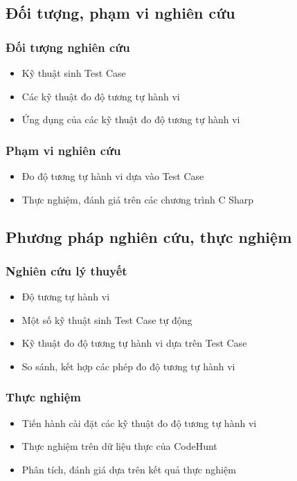 	\subsection*{Đối tượng, phạm vi nghiên cứu}	
		\subsubsection*{Đối tượng nghiên cứu}
		\begin{itemize}
		\item  Kỹ thuật sinh Test Case
		\item  Các kỹ thuật đo độ tương tự hành vi
		\item  Ứng dụng của các kỹ thuật đo độ tương tự hành vi
		\end{itemize}
	
		\subsubsection*{Phạm vi nghiên cứu}
		\begin{itemize}
		\item  Đo độ tương tự hành vi dựa vào Test Case
		\item  Thực nghiệm, đánh giá trên các chương trình C Sharp
		\end{itemize}


	\subsection*{Phương pháp nghiên cứu, thực nghiệm}
		\subsubsection*{Nghiên cứu lý thuyết}
			\begin{itemize}
			\item Độ tương tự hành vi
			\item Một số kỹ thuật sinh Test Case tự động
			\item Kỹ thuật đo độ tương tự hành vi dựa trên Test Case
			\item So sánh, kết hợp các phép đo độ tương tự hành vi
			\end{itemize}
		
		\subsubsection*{Thực nghiệm}
			\begin{itemize}
			\item Tiến hành cài đặt các kỹ thuật đo độ tương tự hành vi
			\item Thực nghiệm trên dữ liệu thực của CodeHunt
			\item Phân tích, đánh giá dựa trên kết quả thực nghiệm
			\end{itemize}


